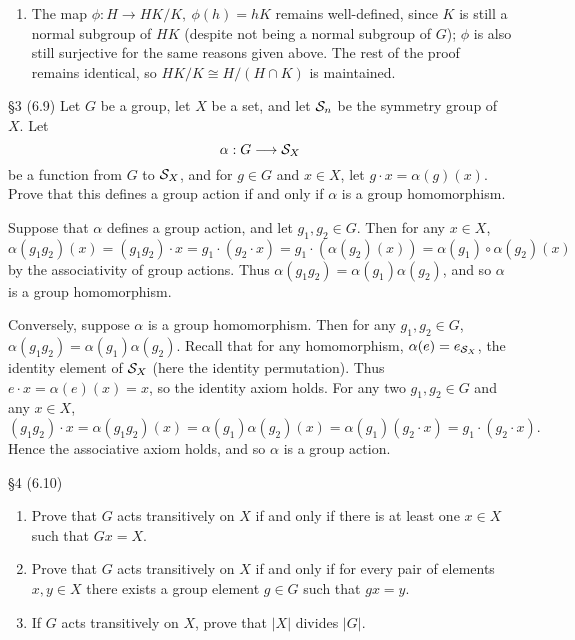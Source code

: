\documentclass{homework}
\begin{document}
\begin{solution}
\begin{enumerate}[label=(\alph*)]
\begin{enumerate}[label=(\alph*)]
        \item The map $\phi:H \to HK / K,\ \phi(h)=hK$ remains well-defined, since $K$ is still a
          normal subgroup of $HK$ (despite not being a normal subgroup of $G$); $\phi$ is also
          still surjective for the same reasons given above. The rest of the proof remains
          identical, so $HK / K\cong H / (H\cap K)$ is maintained.
      \end{enumerate}
  \end{enumerate}
\end{solution}

\begin{problem}{\S 3}
  (6.9) Let $G$ be a group, let $X$ be a set, and let $\mathcal{S}_n$ be the symmetry group of $X$. Let
  \[
    \alpha:G\longrightarrow \mathcal{S}_X
  \] be a function from $G$ to $\mathcal{S}_X$, and for $g\in G$ and $x\in X$, let $g\cdot
  x=\alpha(g)(x)$. Prove that this defines a group action if and only if $\alpha$ is a group
  homomorphism.
\end{problem}
\begin{solution}
  Suppose that $\alpha$ defines a group action, and let $g_1,g_2\in G$. Then for any $x\in X$, \[
    \alpha(g_1g_2)(x)=(g_1g_2)\cdot x=g_1\cdot (g_2\cdot x)=g_1\cdot
    (\alpha(g_2)(x))=\alpha(g_1)\circ \alpha(g_2)(x)
  \] by the associativity of group actions. Thus $\alpha(g_1g_2)=\alpha(g_1)\alpha(g_2)$, and so
  $\alpha$ is a group homomorphism.

  Conversely, suppose $\alpha$ is a group homomorphism. Then for any $g_1,g_2\in G$,
  $\alpha(g_1g_2)=\alpha(g_1)\alpha(g_2)$. Recall that for any homomorphism,
  $\alpha(e)=e_{\mathcal{S}_X}$, the identity element of $\mathcal{S}_X$ (here the identity permutation). Thus
  $e\cdot x=\alpha(e)(x)=x$, so the identity axiom holds. For any two $g_1,g_2\in G$ and any $x\in
  X$, \[
    (g_1g_2)\cdot x=\alpha(g_1g_2)(x)=\alpha(g_1)\alpha(g_2)(x)=\alpha(g_1)(g_2\cdot x)=g_1\cdot
    (g_2\cdot x)
  .\] Hence the associative axiom holds, and so $\alpha$ is a group action.
\end{solution}


\begin{problem}{\S 4}
  (6.10)
  \begin{enumerate}[label=(\alph*)]
    \item Prove that $G$ acts transitively on $X$ if and only if there is at least one $x\in X$ such
      that $Gx=X$.
    \item Prove that $G$ acts transitively on $X$ if and only if for every pair of elements $x,y\in
      X$ there exists a group element $g\in G$ such that $gx=y$.
    \item If $G$ acts transitively on $X$, prove that $\left| X \right| $ divides $\left| G \right|
      $.
  \end{enumerate}
\end{problem}
\end{document}
